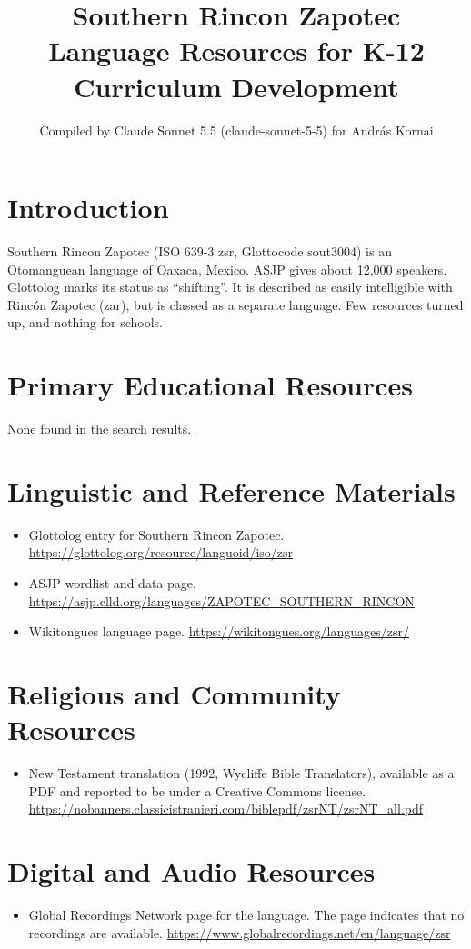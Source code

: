 \documentclass[12pt]{article}
\title{Southern Rincon Zapotec Language Resources for K-12 Curriculum Development}
\author{Compiled by Claude Sonnet 5.5 (claude-sonnet-5-5) for Andr\'as Kornai}
\date{}
\begin{document}
\maketitle

\section{Introduction}
Southern Rincon Zapotec (ISO 639-3 zsr, Glottocode sout3004) is an Otomanguean language of Oaxaca, Mexico. ASJP gives about 12,000 speakers. Glottolog marks its status as ``shifting''. It is described as easily intelligible with Rinc\'on Zapotec (zar), but is classed as a separate language. Few resources turned up, and nothing for schools.

\section{Primary Educational Resources}
None found in the search results.

\section{Linguistic and Reference Materials}
\begin{itemize}
\item Glottolog entry for Southern Rincon Zapotec. \url{https://glottolog.org/resource/languoid/iso/zsr}
\item ASJP wordlist and data page. \url{https://asjp.clld.org/languages/ZAPOTEC_SOUTHERN_RINCON}
\item Wikitongues language page. \url{https://wikitongues.org/languages/zsr/}
\end{itemize}

\section{Religious and Community Resources}
\begin{itemize}
\item New Testament translation (1992, Wycliffe Bible Translators), available as a PDF and reported to be under a Creative Commons license. \url{https://nobanners.classicistranieri.com/biblepdf/zsrNT/zsrNT_all.pdf}
\end{itemize}

\section{Digital and Audio Resources}
\begin{itemize}
\item Global Recordings Network page for the language. The page indicates that no recordings are available. \url{https://www.globalrecordings.net/en/language/zsr}
\end{itemize}
\end{document}
